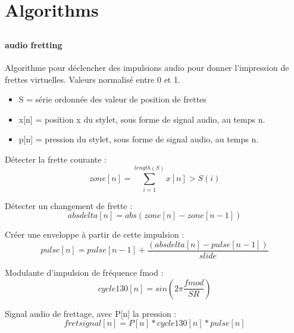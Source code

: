 \chapter{Algorithms}
\label{appendix:algorithms}

\section*{}
\subsection*{}
\subsubsection*{audio fretting}

Algorithme pour déclencher des impulsions audio pour donner l'impression de frettes virtuelles.
Valeurs normalisé entre 0 et 1.

\vspace{-1em}
\begin{itemize}[noitemsep]
\item  S = série ordonnée des valeur de position de frettes\\
\item  x[n] = position x du stylet, sous forme de signal audio, au temps n. \\
\item  p[n] = pression du stylet, sous forme de signal audio, au temps n.\\
\end{itemize}

Détecter la frette courante :
 $$zone[n] = \sum_{i=1}^{length(S)} x[n]>S(i) $$ 

Détecter un changement de frette :
 $$absdelta[n] = abs(zone[n] - zone[n-1]) $$ 

Créer une enveloppe à partir de cette impulsion :
 $$pulse[n] = pulse[n-1] + \frac{(absdelta[n] - pulse[n-1])}{slide} $$ 

Modulante d'impulsion de fréquence fmod :
$$cycle130[n] = sin(2\pi\frac{fmod}{SR})$$

Signal audio de frettage, avec P[n] la pression :
$$fretsignal[n] = P[n] * cycle130[n] * pulse[n]$$
